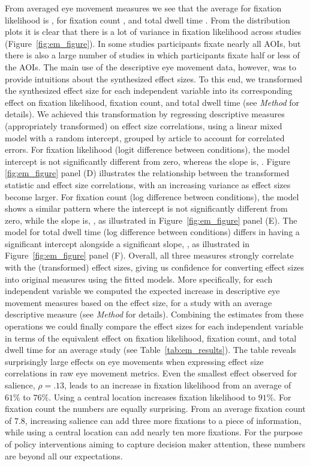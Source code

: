 From averaged eye movement measures we see that the average for fixation likelihood is \unskip, for fixation count \unskip, and total dwell time \unskip. From the distribution plots it is clear that there is a lot of variance in fixation likelihood across studies (Figure~\ref{fig:em_figure}). In some studies participants fixate nearly all AOIs, but there is also a large number of studies in which participants fixate half or less of the AOIs. The main use of the descriptive eye movement data, however, was to provide intuitions about the synthesized effect sizes. To this end, we transformed the synthesized effect size for each independent variable into its corresponding effect on fixation likelihood, fixation count, and total dwell time (see \textit{Method} for details). We achieved this transformation by regressing descriptive measures (appropriately transformed) on effect size correlations, using a linear mixed model with a random intercept, grouped by article to account for correlated errors. For fixation likelihood (logit difference between conditions), the model intercept is not significantly different from zero, whereas the slope is, \unskip. Figure \ref{fig:em_figure} panel (D) illustrates the relationship between the transformed statistic and effect size correlations, with an increasing variance as effect sizes become larger. For fixation count (log difference between conditions), the model shows a similar pattern where the intercept is not significantly different from zero, while the slope is, \unskip, as illustrated in Figure~\ref{fig:em_figure} panel (E). The model for total dwell time (log difference between conditions) differs in having a significant intercept alongside a significant slope, \unskip, as illustrated in Figure~\ref{fig:em_figure} panel (F). Overall, all three measures strongly correlate with the (transformed) effect sizes, giving us confidence for converting effect sizes into original measures using the fitted models. More specifically, for each independent variable we computed the expected increase in descriptive eye movement measures based on the effect size, for a study with an average descriptive measure (see \textit{Method} for details). Combining the estimates from these operations we could finally compare the effect sizes for each independent variable in terms of the equivalent effect on fixation likelihood, fixation count, and total dwell time for an average study (see Table~\ref{tab:em_results}). The table reveals surprisingly large effects on eye movements when expressing effect size correlations in raw eye movement metrics. Even the smallest effect observed for salience, $\rho = .13$, leads to an increase in fixation likelihood from an average of $61\%$ to $76\%$. Using a central location increases fixation likelihood to $91\%$. For fixation count the numbers are equally surprising. From an average fixation count of $7.8$, increasing salience can add three more fixations to a piece of information, while using a central location can add nearly ten more fixations. For the purpose of policy interventions aiming to capture decision maker attention, these numbers are beyond all our expectations.


